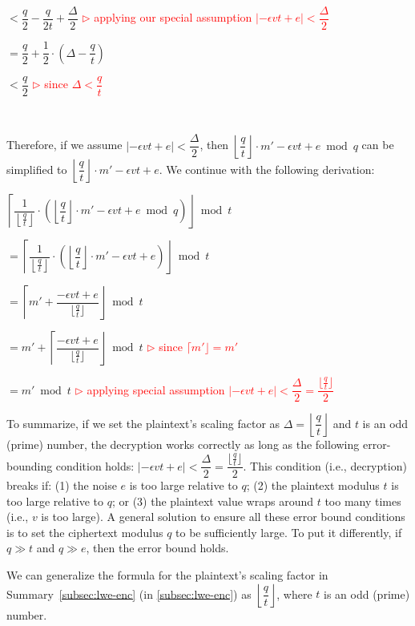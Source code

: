 $ < \dfrac{q}{2} - \dfrac{q}{2t} + \dfrac{\Delta}{2}$ \textcolor{red}{ $\rhd$ applying our special assumption $|-\epsilon vt + e| < \dfrac{\Delta}{2}$}

$ = \dfrac{q}{2} + \dfrac{1}{2}\cdot \left(\Delta - \dfrac{q}{t}\right)$

$< \dfrac{q}{2}$ \textcolor{red}{ $\rhd$ since $\Delta < \dfrac{q}{t}$}


$ $

Therefore, if we assume $|-\epsilon vt + e| < \dfrac{\Delta}{2}$, then $\left\lfloor\dfrac{q}{t}\right\rfloor\cdot m'  - \epsilon vt + e \bmod q$ can be simplified to $\left\lfloor\dfrac{q}{t}\right\rfloor\cdot m'  - \epsilon vt + e$. We continue with the following derivation: 


$\left\lceil\dfrac{1}{\left\lfloor\frac{q}{t}\right\rfloor} \cdot \left(\left\lfloor\dfrac{q}{t}\right\rfloor\cdot m'  - \epsilon vt + e \bmod q \right)\right\rfloor \bmod t$ 

$= \left\lceil\dfrac{1}{\left\lfloor\frac{q}{t}\right\rfloor} \cdot \left(\left\lfloor\dfrac{q}{t}\right\rfloor\cdot m'  - \epsilon vt + e \right)\right\rfloor \bmod t$ 



$= \left\lceil m' + \dfrac{-\epsilon  vt + e  }{\lfloor\frac{q}{t}\rfloor} \right\rfloor \bmod t$ 

$= m' + \left\lceil \dfrac{-\epsilon vt + e }{\lfloor\frac{q}{t}\rfloor} \right\rfloor \bmod t$ \textcolor{red}{ $\rhd$ since $\lceil m' \rfloor = m'$}

$= m' \bmod t$  \textcolor{red}{ $\rhd$ applying special assumption $|-\epsilon vt + e| < \dfrac{\Delta}{2} = \dfrac{\lfloor\frac{q}{t}\rfloor}{2}$}

To summarize, if we set the plaintext's scaling factor as $\Delta=\left\lfloor\dfrac{q}{t}\right\rfloor$ and $t$ is an odd (prime) number, the decryption works correctly as long as the following  error-bounding condition holds: $|-\epsilon vt + e| < \dfrac{\Delta}{2} = \dfrac{\lfloor\frac{q}{t}\rfloor}{2}$. This condition (i.e.,  decryption) breaks if: (1) the noise $e$ is too large relative to $q$; (2) the plaintext modulus $t$ is too large relative to $q$; or (3) the plaintext value wraps around $t$ too many times (i.e., $v$ is too large). A general solution to ensure all these error bound conditions is to set the ciphertext modulus $q$ to be sufficiently large. To put it differently, if $q \gg t$ and $q \gg e$, then the error bound holds. 

We can generalize the formula for the plaintext's scaling factor in Summary~\ref*{subsec:lwe-enc} (in \autoref{subsec:lwe-enc}) as $\left\lfloor\dfrac{q}{t}\right\rfloor$, where $t$ is an odd (prime) number. 


